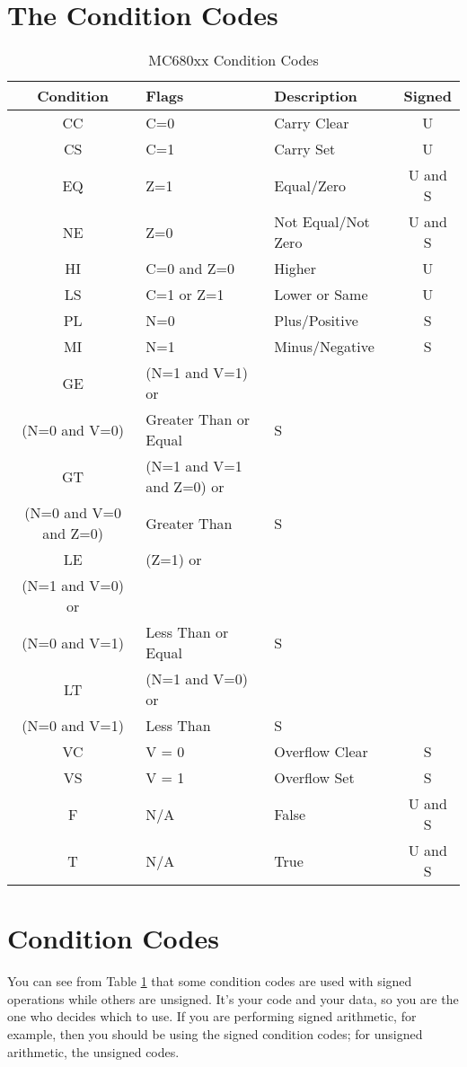 \section{The Condition Codes}

\begin{table}[!h]
\begin{centering}
\begin{tabular}{|c|>{\centering}p{}|>{\centering}p{}|c|}
\hline 
\textbf{Condition} & \textbf{Flags} & \textbf{Description} & \textbf{Signed}\tabularnewline
\hline 
\hline 
CC & C=0 & Carry Clear & U\tabularnewline
\hline 
CS & C=1 & Carry Set & U\tabularnewline
\hline 
EQ & Z=1 & Equal/Zero & U and S\tabularnewline
\hline 
NE & Z=0 & Not Equal/Not Zero & U and S\tabularnewline
\hline 
HI & C=0 and Z=0 & Higher & U\tabularnewline
\hline 
LS & C=1 or Z=1 & Lower or Same & U\tabularnewline
\hline 
PL & N=0 & Plus/Positive & S\tabularnewline
\hline 
MI & N=1 & Minus/Negative & S\tabularnewline
\hline 
GE & (N=1 and V=1) or\\
(N=0 and V=0) & Greater Than or Equal & S\tabularnewline
\hline 
GT & (N=1 and V=1 and Z=0) or \\
(N=0 and V=0 and Z=0) & Greater Than & S\tabularnewline
\hline 
LE & (Z=1) or \\
(N=1 and V=0) or \\
(N=0 and V=1) & Less Than or Equal & S\tabularnewline
\hline 
LT & (N=1 and V=0) or \\
(N=0 and V=1) & Less Than & S\tabularnewline
\hline 
VC & V = 0 & Overflow Clear & S \tabularnewline
\hline
VS & V = 1 & Overflow Set & S \tabularnewline
\hline
F & N/A & False & U and S \tabularnewline
\hline
T & N/A & True & U and S \tabularnewline
\hline
\end{tabular}
\par\end{centering}
\caption{MC680xx Condition Codes\label{tab:MC680xx-Condition-Codes}}
\end{table}


\section{Condition Codes}

You can see from Table \ref{tab:MC680xx-Condition-Codes} that some condition codes are used with signed operations while others are unsigned. It's your  code and your data, so you are the one who decides which to use. If you are performing signed arithmetic, for example, then you should be using the signed condition codes; for unsigned arithmetic, the unsigned codes. 

